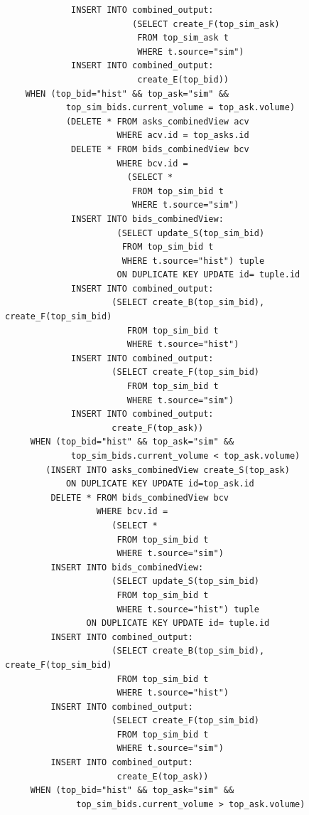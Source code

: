 \documentclass{article}
\begin{document}
\begin{verbatim}
             INSERT INTO combined_output:
                         (SELECT create_F(top_sim_ask)
                          FROM top_sim_ask t
                          WHERE t.source="sim")
             INSERT INTO combined_output:
                          create_E(top_bid))
    WHEN (top_bid="hist" && top_ask="sim" &&
            top_sim_bids.current_volume = top_ask.volume)
            (DELETE * FROM asks_combinedView acv
                      WHERE acv.id = top_asks.id
             DELETE * FROM bids_combinedView bcv
                      WHERE bcv.id = 
                        (SELECT *
                         FROM top_sim_bid t
                         WHERE t.source="sim")
             INSERT INTO bids_combinedView: 
                      (SELECT update_S(top_sim_bid)
                       FROM top_sim_bid t
                       WHERE t.source="hist") tuple
                      ON DUPLICATE KEY UPDATE id= tuple.id
             INSERT INTO combined_output:
                     (SELECT create_B(top_sim_bid), create_F(top_sim_bid)
                        FROM top_sim_bid t
                        WHERE t.source="hist")
             INSERT INTO combined_output:
                     (SELECT create_F(top_sim_bid)
                        FROM top_sim_bid t
                        WHERE t.source="sim")
             INSERT INTO combined_output:
                     create_F(top_ask))
     WHEN (top_bid="hist" && top_ask="sim" &&
             top_sim_bids.current_volume < top_ask.volume)
        (INSERT INTO asks_combinedView create_S(top_ask)
            ON DUPLICATE KEY UPDATE id=top_ask.id
         DELETE * FROM bids_combinedView bcv
                  WHERE bcv.id = 
                     (SELECT *
                      FROM top_sim_bid t
                      WHERE t.source="sim")
         INSERT INTO bids_combinedView: 
                     (SELECT update_S(top_sim_bid)
                      FROM top_sim_bid t
                      WHERE t.source="hist") tuple
                ON DUPLICATE KEY UPDATE id= tuple.id
         INSERT INTO combined_output:
                     (SELECT create_B(top_sim_bid), create_F(top_sim_bid)
                      FROM top_sim_bid t
                      WHERE t.source="hist")
         INSERT INTO combined_output:
                     (SELECT create_F(top_sim_bid)
                      FROM top_sim_bid t
                      WHERE t.source="sim")           
         INSERT INTO combined_output:
                      create_E(top_ask))
     WHEN (top_bid="hist" && top_ask="sim" &&
              top_sim_bids.current_volume > top_ask.volume)              

\end{verbatim}
\end{document}
